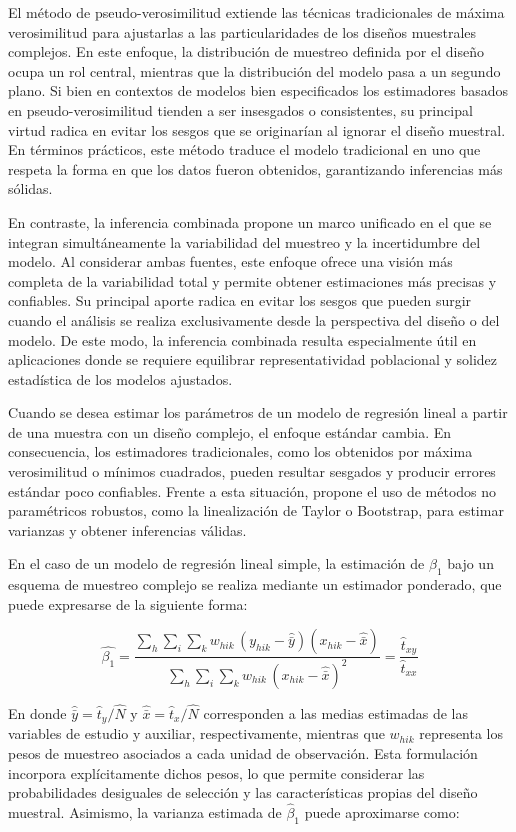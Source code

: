 \documentclass[
  spanish,
  12pt,
]{book}
\begin{document}
El método de pseudo-verosimilitud extiende las técnicas tradicionales de máxima verosimilitud para ajustarlas a las particularidades de los diseños muestrales complejos. En este enfoque, la distribución de muestreo definida por el diseño ocupa un rol central, mientras que la distribución del modelo pasa a un segundo plano. Si bien en contextos de modelos bien especificados los estimadores basados en pseudo-verosimilitud tienden a ser insesgados o consistentes, su principal virtud radica en evitar los sesgos que se originarían al ignorar el diseño muestral. En términos prácticos, este método traduce el modelo tradicional en uno que respeta la forma en que los datos fueron obtenidos, garantizando inferencias más sólidas.

En contraste, la inferencia combinada propone un marco unificado en el que se integran simultáneamente la variabilidad del muestreo y la incertidumbre del modelo. Al considerar ambas fuentes, este enfoque ofrece una visión más completa de la variabilidad total y permite obtener estimaciones más precisas y confiables. Su principal aporte radica en evitar los sesgos que pueden surgir cuando el análisis se realiza exclusivamente desde la perspectiva del diseño o del modelo. De este modo, la inferencia combinada resulta especialmente útil en aplicaciones donde se requiere equilibrar representatividad poblacional y solidez estadística de los modelos ajustados.

Cuando se desea estimar los parámetros de un modelo de regresión lineal a partir de una muestra con un diseño complejo, el enfoque estándar cambia. En consecuencia, los estimadores tradicionales, como los obtenidos por máxima verosimilitud o mínimos cuadrados, pueden resultar sesgados y producir errores estándar poco confiables. Frente a esta situación, \citet{wolter2007} propone el uso de métodos no paramétricos robustos, como la linealización de Taylor o Bootstrap, para estimar varianzas y obtener inferencias válidas.

En el caso de un modelo de regresión lineal simple, la estimación de \(\beta_1\) bajo un esquema de muestreo complejo se realiza mediante un estimador ponderado, que puede expresarse de la siguiente forma:

\[
\hat{\beta_{1}}  =
\frac{\sum_{h} \sum_{i} \sum_{k} w_{hik}\,(y_{hik}-\hat{\bar{y}})(x_{hik}-\hat{\bar{x}})}
{\sum_{h} \sum_{i} \sum_{k} w_{hik}\,(x_{hik}-\hat{\bar{x}})^{2}}
=
\frac{\hat{t}_{xy}}{\hat{t}_{xx}}
\]

En donde \(\hat{\bar{y}}=\hat{t}_y/\hat{N}\) y \(\hat{\bar{x}}=\hat{t}_x/\hat{N}\) corresponden a las medias estimadas de las variables de estudio y auxiliar, respectivamente, mientras que \(w_{hik}\) representa los pesos de muestreo asociados a cada unidad de observación. Esta formulación incorpora explícitamente dichos pesos, lo que permite considerar las probabilidades desiguales de selección y las características propias del diseño muestral. Asimismo, la varianza estimada de \(\hat{\beta}_1\) puede aproximarse como:
\end{document}
